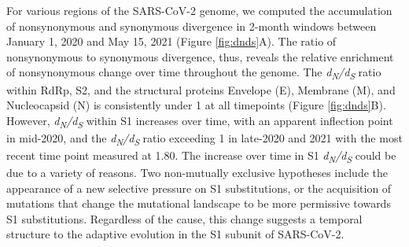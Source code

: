\documentclass[11pt,oneside,letterpaper]{article}
\begin{document}
For various regions of the SARS-CoV-2 genome, we computed the accumulation of nonsynonymous and synonymous divergence in 2-month windows between January 1, 2020 and May 15, 2021 (Figure \ref{fig:dnds}A).
The ratio of nonsynonymous to synonymous divergence, thus, reveals the relative enrichment of nonsynonymous change over time throughout the genome. 
The \emph{d\textsubscript{N}/d\textsubscript{S}} ratio within RdRp, S2, and the structural proteins Envelope (E), Membrane (M), and Nucleocapsid (N) is consistently under 1 at all timepoints (Figure \ref{fig:dnds}B).
However, \emph{d\textsubscript{N}/d\textsubscript{S}} within S1 increases over time, with an apparent inflection point in mid-2020, and the \emph{d\textsubscript{N}/d\textsubscript{S}} ratio exceeding 1 in late-2020 and 2021 with the most recent time point measured at 1.80.
The increase over time in S1 \emph{d\textsubscript{N}/d\textsubscript{S}} could be due to a variety of reasons.
Two non-mutually exclusive hypotheses include the appearance of a new selective pressure on S1 substitutions, or the acquisition of mutations that change the mutational landscape to be more permissive towards S1 substitutions.
Regardless of the cause, this change suggests a temporal structure to the adaptive evolution in the S1 subunit of SARS-CoV-2.
\end{document}
